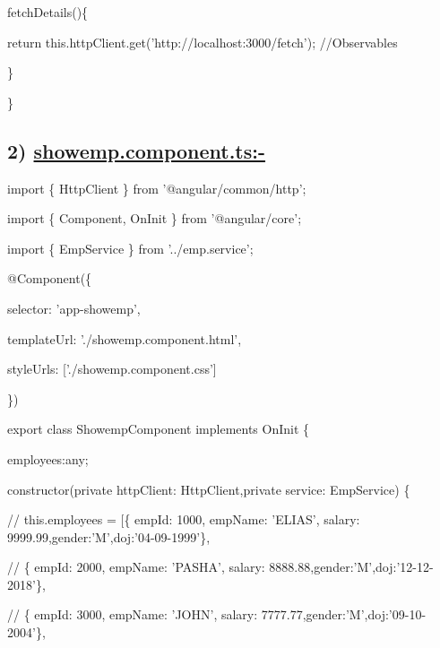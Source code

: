 \documentclass[11pt,twoside]{article}
\begin{document}
\hspace*{5}fetchDetails()\{

\hspace*{10}return this.httpClient.get('http://localhost:3000/fetch'); //Observables

\hspace*{5}\} 

\vspace{1\baselineskip}
\}

\vspace{1\baselineskip}
\subsection*{2) \uline{showemp.component.ts:-}}

\vspace{1\baselineskip}
import \{ HttpClient \} from '@angular/common/http'; 

import \{ Component, OnInit \} from '@angular/core'; 

import \{ EmpService \} from '../emp.service';

\vspace{1\baselineskip}
@Component(\{

\hspace*{5}selector: 'app-showemp',

\hspace*{5}templateUrl: './showemp.component.html',

\hspace*{5}styleUrls: ['./showemp.component.css']

\})

export class ShowempComponent implements OnInit \{

  \hspace*{5}employees:any;

\vspace{1\baselineskip}
\hspace*{5}constructor(private httpClient: HttpClient,private service: EmpService) \{

  \hspace*{10}// this.employees = [\{ empId: 1000, empName: 'ELIAS', salary: 9999.99,gender:'M',doj:'04-09-1999'\},

  \hspace*{10}// \{ empId: 2000, empName: 'PASHA', salary: 8888.88,gender:'M',doj:'12-12-2018'\},

  \hspace*{10}// \{ empId: 3000, empName: 'JOHN', salary: 7777.77,gender:'M',doj:'09-10-2004'\},
\end{document}
